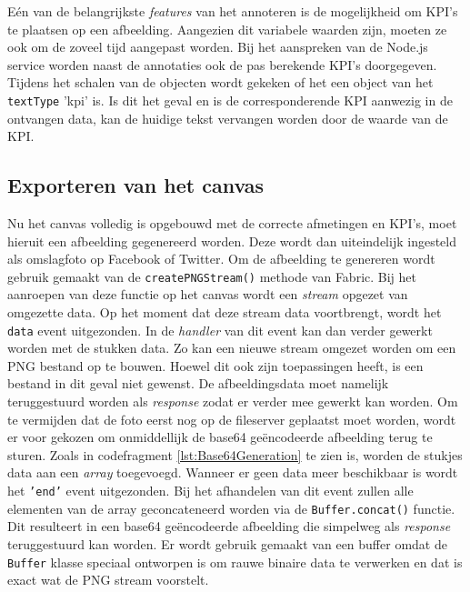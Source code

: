E\'{e}n van de belangrijkste \textit{features} van het annoteren is de mogelijkheid om KPI's te plaatsen op een afbeelding. Aangezien dit variabele waarden zijn, moeten ze ook om de zoveel tijd aangepast worden. Bij het aanspreken van de Node.js service worden naast de annotaties ook de pas berekende KPI's doorgegeven. Tijdens het schalen van de objecten wordt gekeken of het een object van het \texttt{textType} 'kpi' is. %
Is dit het geval en is de corresponderende KPI aanwezig in de ontvangen data, kan de huidige tekst vervangen worden door de waarde van de KPI. 
 
\subsection{Exporteren van het canvas} \label{ExporterenVanHetCanvas}
Nu het canvas volledig is opgebouwd met de correcte afmetingen en KPI's, moet hieruit een afbeelding gegenereerd worden. Deze wordt dan uiteindelijk ingesteld als omslagfoto op Facebook of Twitter. Om de afbeelding te genereren wordt gebruik gemaakt van de \texttt{createPNGStream()} methode van Fabric. Bij het aanroepen van deze functie op het canvas wordt een \textit{stream} opgezet van omgezette data. %
Op het moment dat deze stream data voortbrengt, wordt het \texttt{data} event uitgezonden. In de \textit{handler} van dit event kan dan verder gewerkt worden met de stukken data. Zo kan een nieuwe stream omgezet worden om een PNG bestand op te bouwen. %
Hoewel dit ook zijn toepassingen heeft, is een bestand in dit geval niet gewenst. De afbeeldingsdata moet namelijk teruggestuurd worden als \textit{response} zodat er verder mee gewerkt kan worden. 
Om te vermijden dat de foto eerst nog op de fileserver geplaatst moet worden, wordt er voor gekozen om onmiddellijk de base64 ge\"{e}ncodeerde afbeelding terug te sturen. Zoals in codefragment \ref{lst:Base64Generation} te zien is, worden de stukjes data aan een \textit{array} toegevoegd. Wanneer er geen data meer beschikbaar is wordt het \texttt{'end'} event uitgezonden. Bij het afhandelen van dit event zullen alle elementen van de array geconcateneerd worden via de \texttt{Buffer.concat()} functie. Dit resulteert in een base64 ge\"{e}ncodeerde afbeelding die simpelweg als \textit{response} teruggestuurd kan worden. Er wordt gebruik gemaakt van een buffer omdat de \texttt{Buffer} klasse speciaal ontworpen is om rauwe binaire data te verwerken en dat is exact wat de PNG stream voorstelt. %

